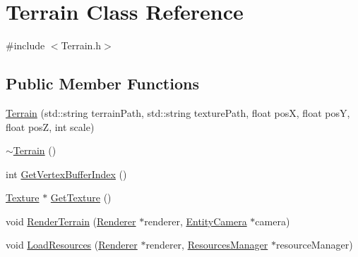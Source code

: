 \hypertarget{class_terrain}{\section{Terrain Class Reference}
\label{class_terrain}
}


{\ttfamily \#include $<$Terrain.\-h$>$}

\subsection*{Public Member Functions}
\begin{DoxyCompactItemize}
\item 
\hyperlink{class_terrain_aab136fa00d10b121d9799b0d0a006102}{Terrain} (std\-::string terrain\-Path, std\-::string texture\-Path, float pos\-X, float pos\-Y, float pos\-Z, int scale)
\item 
\hyperlink{class_terrain_a2f7f0a2aee54886324ccf48a6f321de0}{$\sim$\-Terrain} ()
\item 
int \hyperlink{class_terrain_a7d1361617c21885d0d816090faf462b9}{Get\-Vertex\-Buffer\-Index} ()
\item 
\hyperlink{class_texture}{Texture} $\ast$ \hyperlink{class_terrain_a1c65ab5fa6f82c91efbdb62436366a12}{Get\-Texture} ()
\item 
void \hyperlink{class_terrain_a2f114bc741c5bf09432e973d6d050f58}{Render\-Terrain} (\hyperlink{class_renderer}{Renderer} $\ast$renderer, \hyperlink{class_entity_camera}{Entity\-Camera} $\ast$camera)
\item 
void \hyperlink{class_terrain_abe7570ab57a388d9ac9fd7435384fe35}{Load\-Resources} (\hyperlink{class_renderer}{Renderer} $\ast$renderer, \hyperlink{class_resources_manager}{Resources\-Manager} $\ast$resource\-Manager)
\end{DoxyCompactItemize}


